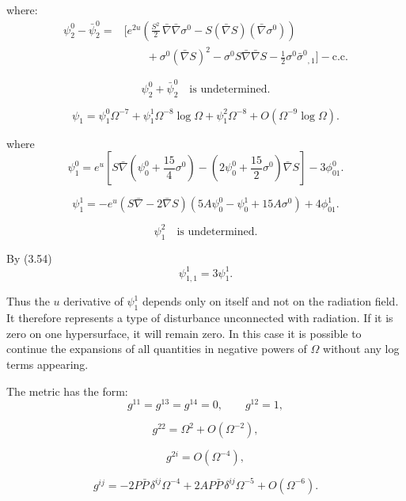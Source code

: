 where:
\begin{equation}
\begin{aligned}
\psi_2^0-\bar{\psi}_2^0
={}&
\Bigg[
e^{2u}
\left(
\frac{S^2}{2}\,
\bar{\nabla}\bar{\nabla}\sigma^0
-
S(\bar{\nabla}S)(\bar{\nabla}\sigma^0)
\right)
\\
&\qquad
+
\sigma^0(\bar{\nabla}S)^2
-
\sigma^0S\bar{\nabla}\bar{\nabla}S
-
\frac{1}{2}\sigma^0\bar{\sigma}^0{}_{,1}
\Bigg]
-\mathrm{c.c.}
\end{aligned}
\tag{7.38}
\end{equation}

\[
\psi_2^0+\bar{\psi}_2^0
\quad\text{is undetermined}.
\]

\[
\psi_1
=
\psi_1^0\Omega^{-7}
+
\psi_1^1\Omega^{-8}\log\Omega
+
\psi_1^2\Omega^{-8}
+
O(\Omega^{-9}\log\Omega).
\]

where
\begin{equation}
\psi_1^0
=
e^u
\left[
S\bar{\nabla}
\left(
\psi_0^0+\frac{15}{4}\sigma^0
\right)
-
\left(
2\psi_0^0+\frac{15}{2}\sigma^0
\right)
\bar{\nabla}S
\right]
-
3\phi_{01}^0.
\tag{7.39}
\end{equation}

\begin{equation}
\psi_1^1
=
-e^u
\left(
S\bar{\nabla}
-
2\bar{\nabla}S
\right)
\left(
5A\psi_0^0
-
\psi_0^1
+
15A\sigma^0
\right)
+
4\phi_{01}^1.
\tag{7.40}
\end{equation}

\[
\psi_1^2
\quad\text{is undetermined}.
\]

By (3.54)
\begin{equation}
\psi_{1,1}^1
=
3\psi_1^1.
\tag{7.41}
\end{equation}


Thus the $u$ derivative of $\psi_1^1$ depends only on itself
and not on the radiation field. It therefore represents a
type of disturbance unconnected with radiation. If it is
zero on one hypersurface, it will remain zero. In this case
it is possible to continue the expansions of all quantities
in negative powers of $\Omega$ without any log terms appearing.


The metric has the form:
\[
g^{11}=g^{13}=g^{14}=0,
\qquad
g^{12}=1,
\]

\[
g^{22}
=
\Omega^2+O(\Omega^{-2}),
\]

\[
g^{2i}
=
O(\Omega^{-4}),
\]

\[
g^{ij}
=
-2P\bar{P}\,\delta^{ij}\Omega^{-4}
+
2AP\bar{P}\,\delta^{ij}\Omega^{-5}
+
O(\Omega^{-6}).
\]

